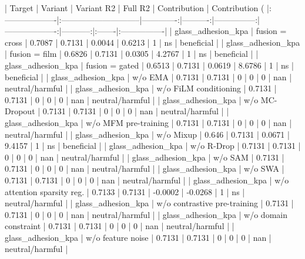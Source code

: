 \documentclass[utf8]{FrontiersinHarvard}
\begin{document}
| Target             | Variant                      |   Variant R2 |   Full R2 |   Contribution |   Contribution (%
|:-------------------|:-----------------------------|-------------:|----------:|---------------:|-------------------:|-----------:|:-------|:----------------|
| glass_adhesion_kpa | fusion = cross               |       0.7087 |    0.7131 |         0.0044 |             0.6213 |          1 | ns     | beneficial      |
| glass_adhesion_kpa | fusion = film                |       0.6826 |    0.7131 |         0.0305 |             4.2767 |          1 | ns     | beneficial      |
| glass_adhesion_kpa | fusion = gated               |       0.6513 |    0.7131 |         0.0619 |             8.6786 |          1 | ns     | beneficial      |
| glass_adhesion_kpa | w/o EMA                      |       0.7131 |    0.7131 |         0      |             0      |          0 | nan    | neutral/harmful |
| glass_adhesion_kpa | w/o FiLM conditioning        |       0.7131 |    0.7131 |         0      |             0      |          0 | nan    | neutral/harmful |
| glass_adhesion_kpa | w/o MC-Dropout               |       0.7131 |    0.7131 |         0      |             0      |          0 | nan    | neutral/harmful |
| glass_adhesion_kpa | w/o MFM pre-training         |       0.7131 |    0.7131 |         0      |             0      |          0 | nan    | neutral/harmful |
| glass_adhesion_kpa | w/o Mixup                    |       0.646  |    0.7131 |         0.0671 |             9.4157 |          1 | ns     | beneficial      |
| glass_adhesion_kpa | w/o R-Drop                   |       0.7131 |    0.7131 |         0      |             0      |          0 | nan    | neutral/harmful |
| glass_adhesion_kpa | w/o SAM                      |       0.7131 |    0.7131 |         0      |             0      |          0 | nan    | neutral/harmful |
| glass_adhesion_kpa | w/o SWA                      |       0.7131 |    0.7131 |         0      |             0      |          0 | nan    | neutral/harmful |
| glass_adhesion_kpa | w/o attention sparsity reg.  |       0.7133 |    0.7131 |        -0.0002 |            -0.0268 |          1 | ns     | neutral/harmful |
| glass_adhesion_kpa | w/o contrastive pre-training |       0.7131 |    0.7131 |         0      |             0      |          0 | nan    | neutral/harmful |
| glass_adhesion_kpa | w/o domain constraint        |       0.7131 |    0.7131 |         0      |             0      |          0 | nan    | neutral/harmful |
| glass_adhesion_kpa | w/o feature noise            |       0.7131 |    0.7131 |         0      |             0      |          0 | nan    | neutral/harmful |
\end{document}
